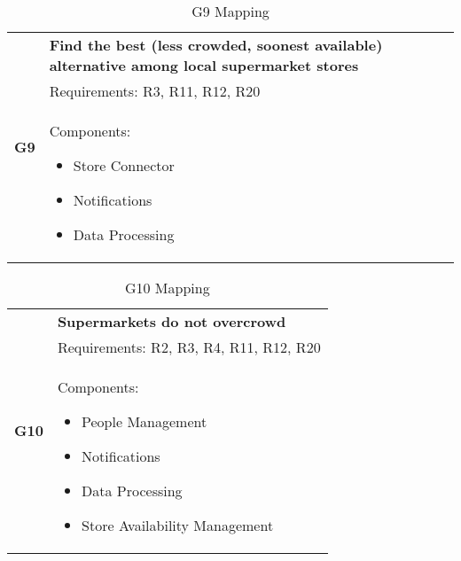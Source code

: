 \begin{table}[H]
	\begin{tabular}{|c|p{14cm}|}
		\hline
		\multirow{3}{*}[-6em]{\textbf{G9}} & \cellcolor{Dandelion} \textbf{Find the best (less crowded, soonest available) alternative among local supermarket stores}\\ \cline{2-2}
		& \cellcolor{GreenYellow} Requirements: R3, R11, R12, R20\\ \cline{2-2}
		& \cellcolor{SkyBlue} Components: \begin{itemize}
			\item Store Connector
			\item Notifications
			\item Data Processing
		\end{itemize}\\ \hline
	\end{tabular}
	\label{tab:G9Mapping}
	\caption{G9 Mapping}
\end{table}

\begin{table}[H]
	\begin{tabular}{|c|p{14cm}|}
		\hline
		\multirow{3}{*}[-5em]{\textbf{G10}} & \cellcolor{Dandelion} \textbf{Supermarkets do not overcrowd}\\ \cline{2-2}
		& \cellcolor{GreenYellow} Requirements: R2, R3, R4, R11, R12, R20\\ \cline{2-2}
		& \cellcolor{SkyBlue} Components: \begin{itemize}
			\item People Management
			\item Notifications
			\item Data Processing
			\item Store Availability Management
		\end{itemize}\\ \hline
	\end{tabular}
	\label{tab:G10Mapping}
	\caption{G10 Mapping}
\end{table}

